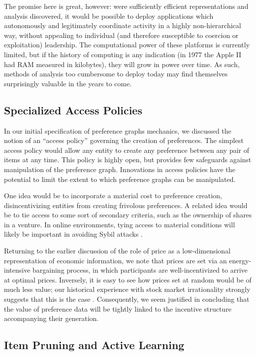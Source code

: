 The promise here is great, however: were sufficiently efficient representations and analysis discovered, it would be possible to deploy applications which autonomously and legitimately coordinate activity  in a highly non-hierarchical way, without appealing to individual (and therefore susceptible to coercion or exploitation) leadership.
The computational power of these platforms is currently limited, but if the history of computing is any indication (in 1977 the Apple II had RAM measured in kilobytes), they will grow in power over time.
As such, methods of analysis too cumbersome to deploy today may find themselves surprisingly valuable in the years to come.

\subsection{Specialized Access Policies}

In our initial specification of preference graphs mechanics, we discussed the notion of an ``access policy'' governing the creation of preferences.
The simplest access policy would allow any entity to create any preference between any pair of items at any time.
This policy is highly open, but provides few safeguards against manipulation of the preference graph.
Innovations in access policies have the potential to limit the extent to which preference graphs can be manipulated.

One idea would be to incorporate a material cost to preference creation, disincentivizing  entities from creating frivolous preferences.
A related idea would be to tie access to some sort of secondary criteria, such as the ownership of shares in a venture.
In online environments, tying access to material conditions will likely be important in avoiding Sybil attacks \citep{danezis:2006}.

Returning to the earlier discussion of the role of price as a low-dimensional representation of economic information, we note that prices are set via an energy-intensive bargaining process, in which participants are well-incentivized to arrive at optimal prices.
Inversely, it is easy to see how prices set at random would be of much less value; our historical experience with stock market irrationality strongly suggests that this is the case \citep{minsky}.
Consequently, we seem justified in concluding that the value of preference data will be tightly linked to the incentive structure accompanying their generation.

\subsection{Item Pruning and Active Learning}

